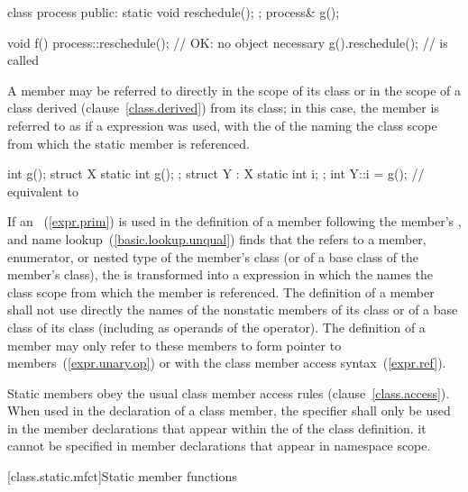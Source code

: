 \begin{codeblock}
class process {
public:
	static void reschedule();
};
process& g();

void f()
{
	process::reschedule();		// OK: no object necessary
	g().reschedule();		//  is called
}
\end{codeblock}
\exitexampleb
A  member may be referred to directly in the scope of its
class or in the scope of a class derived (clause~\ref{class.derived})
from its class; in this case, the  member is referred to
as if a  expression was used, with the
 of the  naming
the class scope from which the static member is referenced.
\enterexample

\begin{codeblock}
int g();
struct X {
	static int g();
};
struct Y : X {
	static int i;
};
int Y::i = g();                 // equivalent to 
\end{codeblock}
\exitexampleb

\pnum
If an ~(\ref{expr.prim}) is used in the
definition of a  member following the member's
, and name lookup~(\ref{basic.lookup.unqual})
finds that the  refers to a 
member, enumerator, or nested type of the member's class (or of a base
class of the member's class), the  is
transformed into a  expression in which the
 names the class scope from which the
member is referenced. The definition of a  member shall
not use directly the names of the nonstatic members of its class or of a
base class of its class (including as operands of the 
operator). The definition of a  member may only refer to
these members to form pointer to members~(\ref{expr.unary.op}) or with
the class member access syntax~(\ref{expr.ref}).

\pnum
Static members obey the usual class member access rules
(clause~\ref{class.access}). When used in the declaration of a class
member, the  specifier shall only be used in the member
declarations that appear within the  of
the class definition.
\enternote
it cannot be specified in member declarations that appear in namespace scope.
\exitnote

[class.static.mfct]{Static member functions}
%


